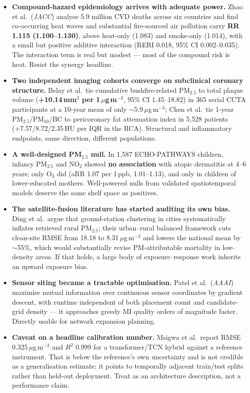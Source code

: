 \documentclass[10pt]{article}
\begin{document}
\footnotesize
\begin{itemize}
\item \textbf{Compound-hazard epidemiology arrives with adequate power.} Zhao et al.\
(\textit{JACC}) analyse 5.9 million CVD deaths across six countries and find co-occurring
heat waves and substantial fire-sourced air pollution carry \textbf{RR 1.115
(1.100--1.130)}, above heat-only (1.083) and smoke-only (1.014), with a small but
positive additive interaction (RERI 0.018, 95\% CI 0.002--0.035). The interaction term is
real but modest --- most of the compound risk is heat. Resist the synergy headline.

\item \textbf{Two independent imaging cohorts converge on subclinical coronary
structure.} Belay et al.\ tie cumulative bushfire-related PM$_{2.5}$ to total plaque
volume (\textbf{+10.14\,mm$^3$ per 1\,$\mu$g\,m$^{-3}$}, 95\% CI 1.45--18.82) in 365
serial CCTA participants at a 10-year mean of only $\sim$5.9\,$\mu$g\,m$^{-3}$; Chen
et al.\ tie 1-year PM$_{2.5}$/PM$_{10}$/BC to pericoronary fat attenuation index in
5{,}528 patients (+7.57/8.72/2.35\,HU per IQR in the RCA). Structural and inflammatory
endpoints, same direction, different populations.

\item \textbf{A well-designed PM$_{2.5}$ null.} In 1{,}587 ECHO-PATHWAYS children,
infancy PM$_{2.5}$ and NO$_2$ showed \textbf{no association} with atopic dermatitis at
4--6 years; only O$_3$ did (aRR 1.07 per 1\,ppb, 1.01--1.13), and only in children of
lower-educated mothers. Well-powered nulls from validated spatiotemporal models deserve
the same shelf space as positives.

\item \textbf{The satellite-fusion literature has started auditing its own bias.} Ding
et al.\ argue that ground-station clustering in cities systematically inflates retrieved
rural PM$_{2.5}$; their urban--rural balanced framework cuts clean-site RMSE from 18.18
to 8.31\,$\mu$g\,m$^{-3}$ and lowers the national mean by $\sim$55\%, which would
substantially revise PM-attributable mortality in low-density areas. If that holds, a
large body of exposure--response work inherits an upward exposure bias.

\item \textbf{Sensor siting became a tractable optimisation.} Patel et al.\
(\textit{AAAI}) maximise mutual information over continuous sensor coordinates by
gradient descent, with runtime independent of both placement count and candidate-grid
density --- it approaches greedy MI quality orders of magnitude faster. Directly usable
for network expansion planning.

\item \textbf{Caveat on a headline calibration number.} Msigwa et al.\ report RMSE
0.325\,$\mu$g\,m$^{-3}$ and $R^2$ 0.999 for a transformer/TCN hybrid against a reference
instrument. That is below the reference's own uncertainty and is not credible as a
generalisation estimate; it points to temporally adjacent train/test splits rather than
held-out deployment. Treat as an architecture description, not a performance claim.
\end{itemize}
\end{document}
